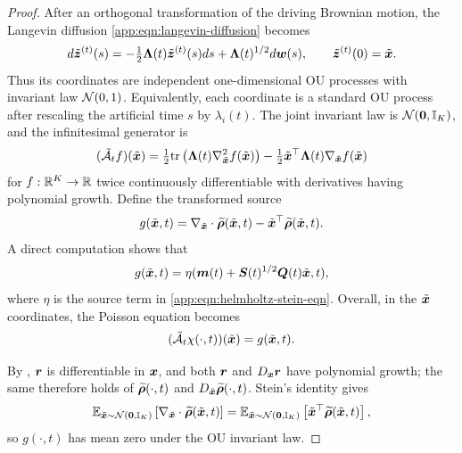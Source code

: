 \begin{proof}
After an orthogonal transformation of the driving Brownian motion, the Langevin diffusion \cref{app:eqn:langevin-diffusion} becomes
\begin{equation}\label{app:eqn:ou-process-theorem}
    d\tilde{\boldsymbol{z}}^{(t)}(s) = -\tfrac{1}{2}\boldsymbol{\Lambda}(t)\tilde{\boldsymbol{z}}^{(t)}(s)ds + \boldsymbol{\Lambda}(t)^{1/2}d\boldsymbol{w}(s), \qquad \tilde{\boldsymbol{z}}^{(t)}(0)=\tilde{\boldsymbol{x}}.
\end{equation}
Thus its coordinates are independent one-dimensional OU processes with invariant law $\mathcal{N}(0,1)$. Equivalently, each coordinate is a standard OU process after rescaling the artificial time $s$ by $\lambda_i(t)$. The joint invariant law is $\mathcal{N}(\boldsymbol{0},\mathbb{I}_K)$, and the infinitesimal generator is
\begin{equation*}
    (\tilde{\mathcal{A}}_t f)(\tilde{\boldsymbol{x}}) = \tfrac{1}{2}\mathrm{tr}\left( \boldsymbol{\Lambda}(t)\nabla_{\tilde{\boldsymbol{x}}}^2 f(\tilde{\boldsymbol{x}}) \right) - \tfrac{1}{2}\tilde{\boldsymbol{x}}^\top \boldsymbol{\Lambda}(t)\nabla_{\tilde{\boldsymbol{x}}}f(\tilde{\boldsymbol{x}})
\end{equation*}
for $f:\mathbb{R}^K\to\mathbb{R}$ twice continuously differentiable with derivatives having polynomial growth. Define the transformed source
\begin{equation}\label{app:eqn:g-definition}
    g(\tilde{\boldsymbol{x}},t) = \nabla_{\tilde{\boldsymbol{x}}}\cdot\widetilde{\boldsymbol{\rho}}(\tilde{\boldsymbol{x}},t) - \tilde{\boldsymbol{x}}^\top\widetilde{\boldsymbol{\rho}}(\tilde{\boldsymbol{x}},t).
\end{equation}
A direct computation shows that
\begin{equation*}
    g(\tilde{\boldsymbol{x}},t) = \eta(\boldsymbol{m}(t)+\boldsymbol{S}(t)^{1/2}\boldsymbol{Q}(t)\tilde{\boldsymbol{x}},t),
\end{equation*}
where $\eta$ is the source term in \cref{app:eqn:helmholtz-stein-eqn}. Overall, in the $\tilde{\boldsymbol{x}}$ coordinates, the Poisson equation becomes
\begin{equation}\label{app:eqn:whitened-poisson-theorem}
    (\tilde{\mathcal{A}}_t \chi(\cdot, t))(\tilde{\boldsymbol{x}}) = g(\tilde{\boldsymbol{x}}, t).
\end{equation}

By , $\boldsymbol{r}$ is differentiable in $\boldsymbol{x}$, and both $\boldsymbol{r}$ and $D_{\boldsymbol{x}}\boldsymbol{r}$ have polynomial growth; the same therefore holds of $\widetilde{\boldsymbol{\rho}}(\cdot,t)$ and $D_{\tilde{\boldsymbol{x}}}\widetilde{\boldsymbol{\rho}}(\cdot,t)$. Stein's identity gives
\begin{equation*}
    \mathbb{E}_{\tilde{\boldsymbol{x}} \sim \mathcal{N}(\boldsymbol{0},\mathbb{I}_K)}\left[\nabla_{\tilde{\boldsymbol{x}}}\cdot \widetilde{\boldsymbol{\rho}}(\tilde{\boldsymbol{x}},t)\right] = \mathbb{E}_{\tilde{\boldsymbol{x}} \sim \mathcal{N}(\boldsymbol{0},\mathbb{I}_K)}\left[\tilde{\boldsymbol{x}}^\top \widetilde{\boldsymbol{\rho}}(\tilde{\boldsymbol{x}},t)\right],
\end{equation*}
so $g(\cdot, t)$ has mean zero under the OU invariant law.


\end{proof}
